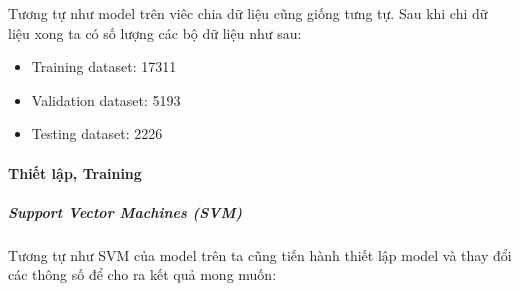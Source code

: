 \documentclass{article}
\begin{document}
Tương tự như model trên viêc chia dữ liệu cũng giống tưng tự. Sau khi chi dữ liệu xong ta có số lượng các bộ dữ liệu như sau:

\begin{itemize}
	\item Training dataset: 17311
	\item Validation dataset: 5193
	\item Testing dataset: 2226
\end{itemize}

\paragraph{Thiết lập, Training}

\subparagraph{Support Vector Machines (SVM)}

Tương tự như SVM của model trên ta cũng tiến hành thiết lập model và thay đổi các thông số để cho ra kết quả mong muốn:
\end{document}
